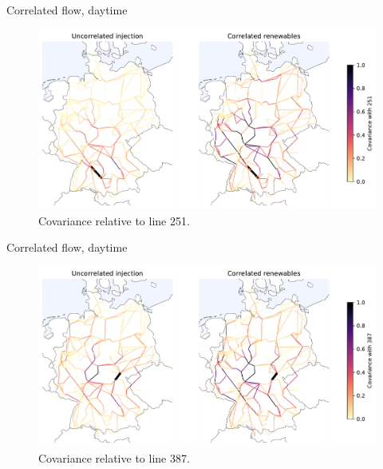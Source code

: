 \documentclass[10pt]{beamer}
\begin{document}
\begin{frame}{Correlated flow, daytime}
    \begin{figure}
    \includegraphics[height=.65\paperheight]{img/flow_correlation_251_iid_and_fullcov.pdf}
    \caption{Covariance relative to line 251.}
    \end{figure}
\end{frame}


\begin{frame}{Correlated flow, daytime}
    \begin{figure}
    \includegraphics[height=.65\paperheight]{img/flow_correlation_387_iid_and_fullcov.pdf}
    \caption{Covariance relative to line 387.}
    \end{figure}
\end{frame}
\end{document}
